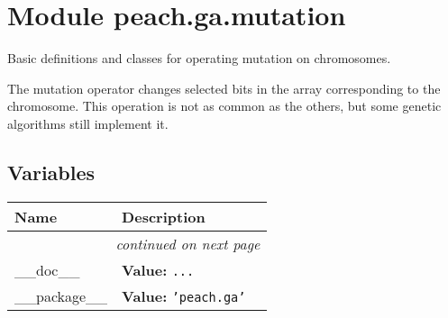 %
%
%


\section{Module peach.ga.mutation}

    \label{peach:ga:mutation}

Basic definitions and classes for operating mutation on chromosomes.

The mutation operator changes selected bits in the array corresponding to the
chromosome. This operation is not as common as the others, but some genetic
algorithms still implement it.


  \subsection{Variables}

    \vspace{-1cm}
\hspace{\varindent}\begin{longtable}{|p{\varnamewidth}|p{\vardescrwidth}|l}
\cline{1-2}
\cline{1-2} \centering \textbf{Name} & \centering \textbf{Description}& \\
\cline{1-2}
\endhead\cline{1-2}\multicolumn{3}{r}{\small\textit{continued on next page}}\\\endfoot\cline{1-2}
\endlastfoot\raggedright \_\-\_\-d\-o\-c\-\_\-\_\- & \raggedright \textbf{Value:} 
{\tt \texttt{...}}&\\
\cline{1-2}
\raggedright \_\-\_\-p\-a\-c\-k\-a\-g\-e\-\_\-\_\- & \raggedright \textbf{Value:} 
{\tt \texttt{'}\texttt{peach.ga}\texttt{'}}&\\
\cline{1-2}
\end{longtable}


